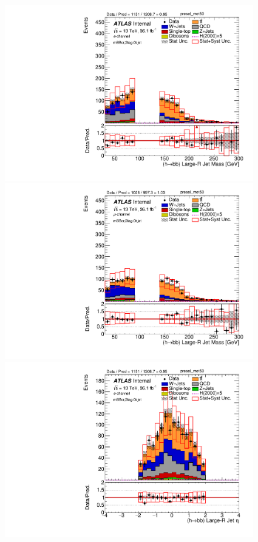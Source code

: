 \begin{figure}[!h]
\begin{center}
\includegraphics[scale=0.33]{./figures/boosted/PlotByChannels/DataMC_2tag_0bjet_mbbcr_elec_presel_met50_HbbMass}                                                                                    
\includegraphics[scale=0.33]{./figures/boosted/PlotByChannels/DataMC_2tag_0bjet_mbbcr_muon_presel_met50_HbbMass}                                                                                    
\includegraphics[scale=0.33]{./figures/boosted/PlotByChannels/DataMC_2tag_0bjet_mbbcr_elec_presel_met50_HbbEta}                                                              

\end{center}
\end{figure}
